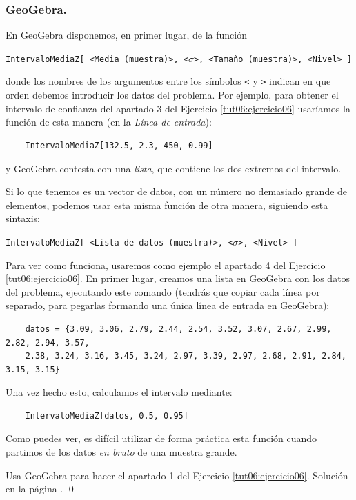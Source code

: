 \documentclass[10pt,a4paper]{article}\usepackage[]{graphicx}\usepackage[]{color}
\newcounter {cont01}
\begin{document}
\subsubsection*{GeoGebra.}

En GeoGebra disponemos, en primer lugar, de la función
  \begin{center}
    \verb&IntervaloMediaZ[ <Media (muestra)>, <&$\sigma$\verb&>, <Tamaño (muestra)>, <Nivel> ]&
  \end{center}
donde los nombres de los argumentos entre los símbolos {\tt <} y {\tt >} indican en que orden debemos introducir los datos del problema. Por ejemplo, para obtener el intervalo de confianza del apartado 3 del Ejercicio \ref{tut06:ejercicio06} usaríamos la función de esta manera (en la {\em Línea de entrada}):
  \begin{verbatim}
    IntervaloMediaZ[132.5, 2.3, 450, 0.99]
  \end{verbatim}
y GeoGebra contesta con una {\em lista}, que contiene los dos extremos del intervalo.

Si lo que tenemos es un vector de datos, con un número no demasiado grande de elementos, podemos usar esta misma función de otra manera, siguiendo esta sintaxis:
  \begin{center}
    \verb&IntervaloMediaZ[ <Lista de datos (muestra)>, <&$\sigma$\verb&>, <Nivel> ]&
  \end{center}
Para ver como funciona, usaremos como ejemplo el apartado 4 del Ejercicio \ref{tut06:ejercicio06}. En primer lugar, creamos una lista en GeoGebra con los datos del problema, ejecutando este comando (tendrás que copiar cada línea por separado, para pegarlas formando  una única línea de entrada en GeoGebra):
  \begin{verbatim}
    datos = {3.09, 3.06, 2.79, 2.44, 2.54, 3.52, 3.07, 2.67, 2.99, 2.82, 2.94, 3.57,
    2.38, 3.24, 3.16, 3.45, 3.24, 2.97, 3.39, 2.97, 2.68, 2.91, 2.84, 3.15, 3.15}
  \end{verbatim}
Una vez hecho esto, calculamos el intervalo mediante:
\begin{verbatim}
    IntervaloMediaZ[datos, 0.5, 0.95]
\end{verbatim}
Como puedes ver, es difícil utilizar de forma práctica esta función cuando partimos de los datos {\em en bruto} de una muestra grande.
\begin{ejercicio}
\label{tut06:ejercicio07}
Usa GeoGebra para hacer el apartado 1 del Ejercicio \ref{tut06:ejercicio06}. Solución en la página \pageref{tut06:ejercicio07:sol}.
\qed
\end{ejercicio}
\end{document}
